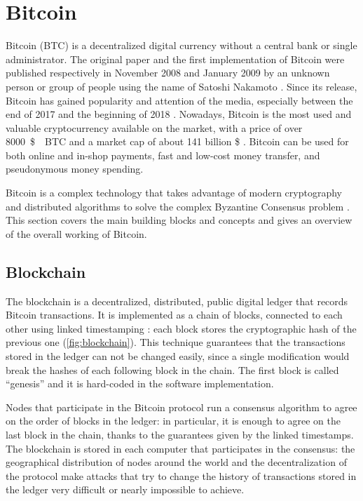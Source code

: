 \chapter{Bitcoin}
\label{chapter:bitcoin}
Bitcoin (BTC) is a decentralized digital currency without a central bank or single administrator.
The original paper \cite{bitcoin_2009} and the first implementation of Bitcoin were published respectively in November \num{2008} and January \num{2009} by an unknown person or group of people using the name of Satoshi Nakamoto \cite{bitcoin_website}.
Since its release, Bitcoin has gained popularity and attention of the media, especially between the end of \num{2017} and the beginning of \num{2018} \cite{bbc_2018, telegraph_2018, ilsole24ore_2018}.
Nowadays, Bitcoin is the most used and valuable cryptocurrency available on the market, with a price of over \SI{8000}{\$ \per BTC} and a market cap of about \num{141} billion \$ \cite{bitcoin_usage_study_2017, stats_coinmarketcap, stats_coinranking, stats_cryptocompare, stats_coincheckup, stats_moonstats}.
Bitcoin can be used for both online and in-shop payments, fast and low-cost money transfer, and pseudonymous money spending.

\bigskip
Bitcoin is a complex technology that takes advantage of modern cryptography and distributed algorithms to solve the complex Byzantine Consensus problem \cite{byzantin_generals_1982}.
This section covers the main building blocks and concepts and gives an overview of the overall working of Bitcoin.

\section{Blockchain}
The blockchain is a decentralized, distributed, public digital ledger that records Bitcoin transactions.
It is implemented as a chain of blocks, connected to each other using linked timestamping \cite{bitcoin_book_narayanan_2016, hash_function_wikipedia}:
each block stores the cryptographic hash of the previous one (\cref{fig:blockchain}).
This technique guarantees that the transactions stored in the ledger can not be changed easily, since a single modification would break the hashes of each following block in the chain.
The first block is called ``genesis'' and it is hard-coded in the software implementation.

Nodes that participate in the Bitcoin protocol run a consensus algorithm to agree on the order of blocks in the ledger:
in particular, it is enough to agree on the last block in the chain, thanks to the guarantees given by the linked timestamps.
The blockchain is stored in each computer that participates in the consensus:
the geographical distribution of nodes around the world and the decentralization of the protocol make attacks that try to change the history of transactions stored in the ledger very difficult or nearly impossible to achieve.

